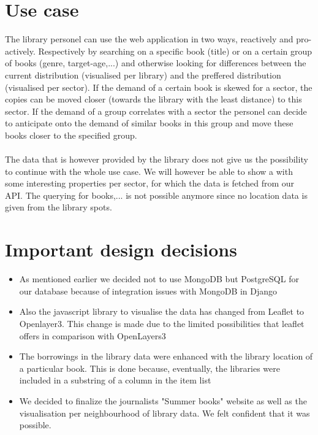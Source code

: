 \section{Use case}

The library personel can use the web application in two ways, reactively and pro-actively. Respectively by searching on a specific book (title) or on a certain group of books (genre, target-age,...) and otherwise looking for differences between the current distribution (visualised per library) and the preffered distribution (visualised per sector). If the demand of a certain book is skewed for a sector, the copies can be moved closer (towards the library with the least distance) to this sector. If the demand of a group correlates with a sector the personel can decide to anticipate onto the demand of similar books in this group and move these books closer to the specified group.\\
\\
The data that is however provided by the library does not give us the possibility to continue with the whole use case. We will however be able to show a with some interesting properties per sector, for which the data is fetched from our API. The querying for books,... is not possible anymore since no location data is given from the library spots.

\section{Important design decisions}

\begin{itemize}
	\item As mentioned earlier we decided not to use MongoDB but PostgreSQL for our database because of integration issues with MongoDB in Django
	\item Also the javascript library to visualise the data has changed from Leaflet to Openlayer3. This change is made due to the limited possibilities that leaflet offers in comparison with OpenLayers3
	\item The borrowings in the library data were enhanced with the library location of a particular book. This is done because, eventually, the libraries were included in a substring of a column in the item list
	\item We decided to finalize the journalists "Summer books" website as well as the visualisation per neighbourhood of library data. We felt confident that it was possible. 
\end{itemize}
